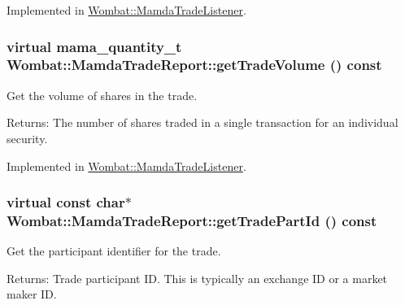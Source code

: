 Implemented in \hyperlink{classWombat_1_1MamdaTradeListener_f2f5cd501bc1fcb6717a81c001004228}{Wombat::Mamda\-Trade\-Listener}.\hypertarget{classWombat_1_1MamdaTradeReport_167dd8f71093494ce5d0ff7a85739cbf}{
\subsubsection[getTradeVolume]{\setlength{\rightskip}{0pt plus 5cm}virtual mama\_\-quantity\_\-t Wombat::Mamda\-Trade\-Report::get\-Trade\-Volume () const}}
\label{classWombat_1_1MamdaTradeReport_167dd8f71093494ce5d0ff7a85739cbf}


Get the volume of shares in the trade. 

\begin{Desc}
\item[Returns:]The number of shares traded in a single transaction for an individual security. \end{Desc}


Implemented in \hyperlink{classWombat_1_1MamdaTradeListener_59830d5b7d9bf0df2e274f8f4ce49cc6}{Wombat::Mamda\-Trade\-Listener}.\hypertarget{classWombat_1_1MamdaTradeReport_eb865e0b7c57732356d925d532364c7b}{
\subsubsection[getTradePartId]{\setlength{\rightskip}{0pt plus 5cm}virtual const char$\ast$ Wombat::Mamda\-Trade\-Report::get\-Trade\-Part\-Id () const}}
\label{classWombat_1_1MamdaTradeReport_eb865e0b7c57732356d925d532364c7b}


Get the participant identifier for the trade. 

\begin{Desc}
\item[Returns:]Trade participant ID. This is typically an exchange ID or a market maker ID. \end{Desc}



